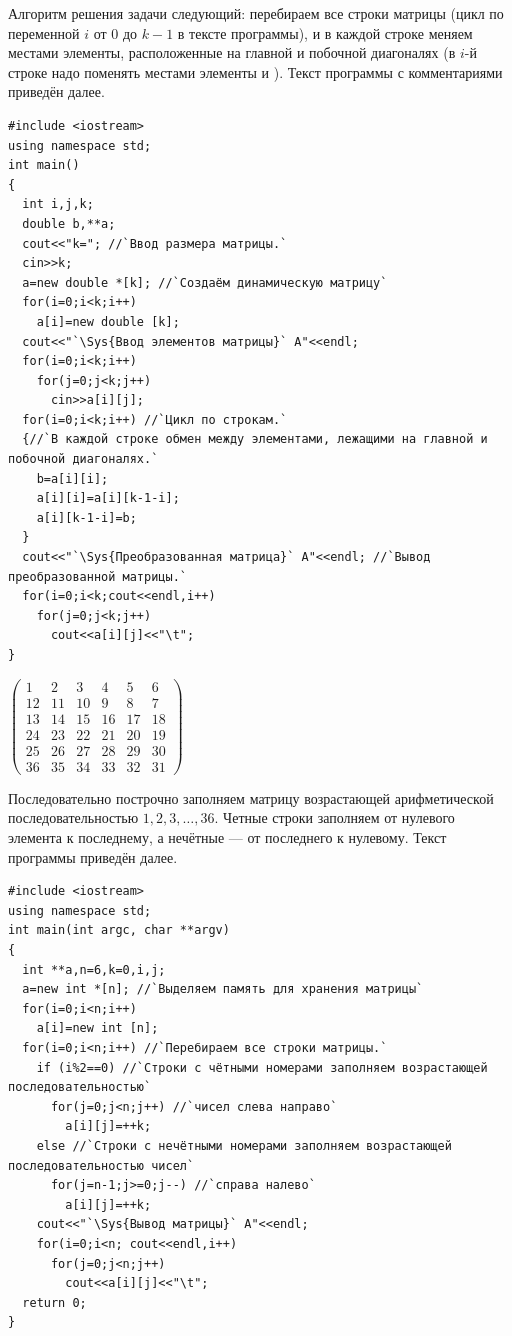 Алгоритм решения задачи следующий: перебираем все строки матрицы (цикл по переменной $i$ от $0$ до
$k-1$ в тексте программы), и в каждой строке меняем местами элементы, расположенные на главной и
побочной диагоналях (в $i$-й строке надо поменять местами элементы  и ).
Текст программы с комментариями приведён  далее.
\begin{lstlisting}
#include <iostream>
using namespace std;
int main()
{
  int i,j,k;
  double b,**a; 
  cout<<"k="; //`Ввод размера матрицы.`
  cin>>k;
  a=new double *[k]; //`Создаём динамическую матрицу`
  for(i=0;i<k;i++)
    a[i]=new double [k];
  cout<<"`\Sys{Ввод элементов матрицы}` A"<<endl;
  for(i=0;i<k;i++)
    for(j=0;j<k;j++)
      cin>>a[i][j];
  for(i=0;i<k;i++) //`Цикл по строкам.`
  {//`В каждой строке обмен между элементами, лежащими на главной и побочной диагоналях.`
    b=a[i][i];
    a[i][i]=a[i][k-1-i];
    a[i][k-1-i]=b;
  }
  cout<<"`\Sys{Преобразованная матрица}` A"<<endl; //`Вывод преобразованной матрицы.`
  for(i=0;i<k;cout<<endl,i++)
    for(j=0;j<k;j++)
      cout<<a[i][j]<<"\t";
}
\end{lstlisting}


$\left(\begin{matrix}
1&2&3&4&5&6\\
12&11&10&9&8&7\\
13&14&15&16&17&18\\
24&23&22&21&20&19\\
25&26&27&28&29&30\\
36&35&34&33&32&31
\end{matrix}\right)$%

Последовательно построчно заполняем матрицу возрастающей арифметической последовательностью  $1,2,3,{\dots},36$. Четные
строки заполняем от нулевого элемента к последнему, а нечётные --- от последнего к нулевому. Текст программы приведён
далее.
\begin{lstlisting}
#include <iostream>
using namespace std;
int main(int argc, char **argv)
{
  int **a,n=6,k=0,i,j;
  a=new int *[n]; //`Выделяем память для хранения матрицы`
  for(i=0;i<n;i++)
    a[i]=new int [n];
  for(i=0;i<n;i++) //`Перебираем все строки матрицы.`
    if (i%2==0) //`Строки с чётными номерами заполняем возрастающей последовательностью`
      for(j=0;j<n;j++) //`чисел слева направо`
        a[i][j]=++k;
    else //`Строки с нечётными номерами заполняем возрастающей последовательностью чисел`
      for(j=n-1;j>=0;j--) //`справа налево`
        a[i][j]=++k;
    cout<<"`\Sys{Вывод матрицы}` A"<<endl;
    for(i=0;i<n; cout<<endl,i++)
      for(j=0;j<n;j++)
        cout<<a[i][j]<<"\t";
  return 0;
}
\end{lstlisting}

